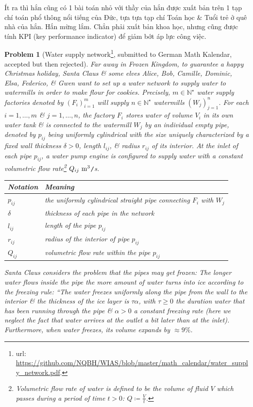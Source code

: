 \documentclass[12pt]{article}
\newtheorem{problem}{Problem}
\begin{document}
Ít ra thì hắn cũng có 1 bài toán nhỏ với thầy của hắn được xuất bản trên 1 tạp chí toán phổ thông nổi tiếng của Đức, tựa tựa tạp chí Toán học \& Tuổi trẻ ở quê nhà của hắn. Hắn mừng lắm. Chẳn phải xuất bản khoa học, nhưng cũng được tính KPI (key performance indicator) để giảm bớt áp lực công việc.

\begin{problem}[Water supply network\footnote{{\sc url}: \url{https://github.com/NQBH/WIAS/blob/master/math_calendar/water_supply_network.pdf}.}, submitted to German {\sc Math Kalendar}, accepted but then rejected]
	Far away in Frozen Kingdom, to guarantee a happy Christmas holiday, Santa Claus \& some elves Alice, Bob, Camille, Dominic, Elsa, Federico, \& Gwen want to set up a water network to supply water to watermills in order to make flour for cookies. Precisely, $m\in\mathbb{N}^\star$ water supply factories denoted by $(F_i)_{i=1}^m$ will supply $n\in\mathbb{N}^\star$ watermills $(W_j)_{j=1}^n$. For each $i = 1,\ldots,m$ \& $j = 1,\ldots,n$, the factory $F_i$ stores water of volume $V_i$ in its own water tank \& is connected to the watermill $W_j$ by an individual empty pipe, denoted by $p_{ij}$ being uniformly cylindrical with the size uniquely characterized by a fixed wall thickness $\delta > 0$, length $l_{ij}$, \& radius $r_{ij}$ of its interior. At the inlet of each pipe $p_{ij}$, a water pump engine is configured to supply water with a constant \emph{volumetric flow rate}\footnote{{\it Volumetric flow rate} of water is defined to be the volume of fluid $V$ which passes during a period of time $t > 0$: $Q\coloneqq\frac{V}{t}$.} $Q_{ij}\ {\rm m}^3${\tt/}{\rm s}.
	\begin{table}[H]
		\centering
		\begin{tabular}{|l|l|}
			\hline
			Notation & Meaning \\
			\hline
			$p_{ij}$ & the uniformly cylindrical straight pipe connecting $F_i$ with $W_j$ \\
			\hline
			$\delta$ & thickness of each pipe in the network \\
			\hline
			$l_{ij}$ & length of the pipe $p_{ij}$ \\
			\hline
			$r_{ij}$ & radius of the interior of pipe $p_{ij}$ \\
			\hline
			$Q_{ij}$ & volumetric ﬂow rate within the pipe $p_{ij}$ \\
			\hline
		\end{tabular}
	\end{table}
	Santa Claus considers the problem that the pipes may get frozen: The longer water flows inside the pipe the more amount of water turns into ice according to the \emph{freezing rule}: ``The water freezes uniformly along the pipe from the wall to the interior \& the thickness of the ice layer is $\tau\alpha$, with $\tau\ge0$ the duration water that has been running through the pipe \& $\alpha > 0$ a constant freezing rate (here we neglect the fact that water arrives at the outlet a bit later than at the inlet). Furthermore, when water freezes, its volume expands by $\approx9\%$.
	

\end{problem}
\end{document}
